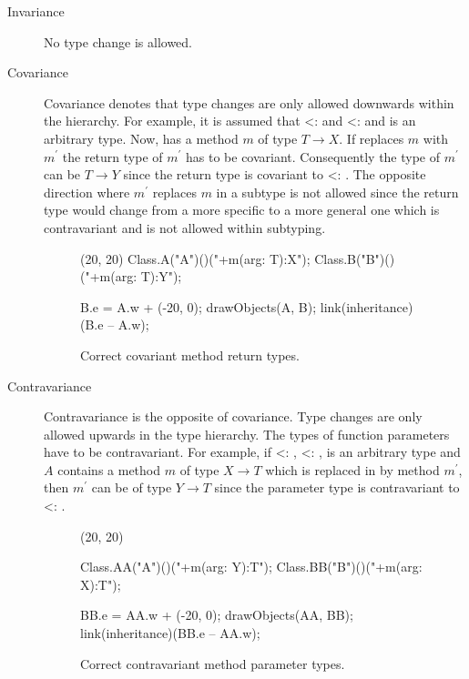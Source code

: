 \begin{description}
	\item[Invariance] No type change is allowed.
	\item[Covariance] Covariance denotes that type changes are only
	allowed downwards within the hierarchy. For example,
	it is assumed that \B <: \A and \Y <: \X and \T is an arbitrary
	type. Now, \A has a method $m$ of type $T \rightarrow X$. If
	\B replaces $m$ with $m^\prime$ the return type of $m^\prime$
	has to be covariant. Consequently the type of $m^\prime$ can be
	$T \rightarrow Y$ since the return type is covariant to \B <:
	\A. The opposite direction where $m^\prime$ replaces $m$ in a
	subtype is not allowed since the return type would change from
	a more specific to a more general one which is contravariant
	and is not allowed within subtyping.
	\begin{figure}[H]
		\centering
		\begin{emp}[classdiag](20, 20)
			Class.A("A")()("+m(arg: T):X");
			Class.B("B")()("+m(arg: T):Y");

			B.e = A.w + (-20, 0);
			drawObjects(A, B);
			link(inheritance)(B.e -- A.w);
		\end{emp}
		\caption{Correct covariant method return types.}
		\label{fig:covariance}
	\end{figure}

	\item[Contravariance] Contravariance is the opposite of
	covariance. Type changes are only allowed upwards in the
	type hierarchy. The types of function parameters have to be
	contravariant. For example, if \B <: \A, \Y <: \X, \T is
	an arbitrary type and $A$ contains a method $m$ of type $X
	\rightarrow T$ which is replaced in \B by method $m^\prime$,
	then $m^\prime$ can be of type $Y \rightarrow T$ since the
	parameter type is contravariant to \B <: \A.
	\begin{figure}[H]
		\centering
		\begin{emp}[classdiag](20, 20)

			Class.AA("A")()("+m(arg: Y):T");
			Class.BB("B")()("+m(arg: X):T");

			BB.e = AA.w + (-20, 0);
			drawObjects(AA, BB);
			link(inheritance)(BB.e -- AA.w);

		\end{emp}
		\caption{Correct contravariant method parameter types.}
		\label{fig:contravariance}
	\end{figure}
\end{description}


